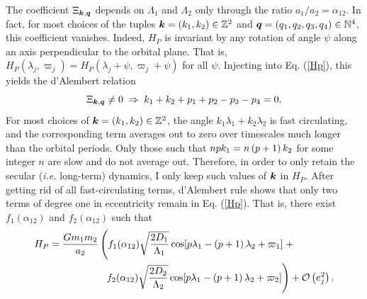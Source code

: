 \documentclass[12pt,a4paper,oneside]{article}
\begin{document}
The coefficient $\Xi_{\mathbf{\boldsymbol{k}},\mathbf{\boldsymbol{q}}}$ depends on $\Lambda_1$ and $\Lambda_2$ only through the ratio $a_1/a_2=\alpha_{12}$. In fact, for most choices of the tuples $\mathbf{\boldsymbol{k}}=\left(k_1,k_2\right)\in\mathbb{Z}^2$ and $\mathbf{\boldsymbol{q}}=\left(q_1,q_2,q_3,q_4\right)\in\mathbb{N}^4$, this coefficient vanishes. Indeed, $H_P$ is invariant by any rotation of angle $\psi$ along an axis perpendicular to the orbital plane. That is, $H_P(\lambda_j,\varpi_j)=H_P(\lambda_j+\psi,\varpi_j+\psi)$ for all $\psi$. Injecting into Eq. (\ref{Hp}), this yields the d'Alembert relation
\begin{equation}
	\Xi_{\mathbf{\boldsymbol{k}},\mathbf{\boldsymbol{q}}}\neq0\;\Rightarrow\;k_1+k_2+p_1+p_2-p_3-p_4=0.
\end{equation}
For most choices of $\mathbf{\boldsymbol{k}}=\left(k_1,k_2\right)\in\mathbb{Z}^2$, the angle $k_1\lambda_1+k_2\lambda_2$ is fast circulating, and the corresponding term averages out to zero over timescales much longer than the orbital periods. Only those such that $npk_1=n\left(p+1\right) k_2$ for some integer $n$ are slow and do not average out. Therefore, in order to only retain the secular (\textit{i.e.} long-term) dynamics, I only keep such values of $\mathbf{\boldsymbol{k}}$ in $H_P$. After getting rid of all fast-circulating terms, d'Alembert rule shows that only two terms of degree one in eccentricity remain in Eq. (\ref{Hp}). That is, there exist $f_1(\alpha_{12})$ and $f_2(\alpha_{12})$ such that
\begin{equation}\label{Pert_Poincare}
	\begin{split}
		H_P=\frac{Gm_1m_2}{a_2}&\left(f_1(\alpha_{12})\sqrt{\frac{2D_1}{\Lambda_1}}\cos[p\lambda_1-\left(p+1\right)\lambda_2+\varpi_1]\;+\right.\\
		&\left.\;\;f_2(\alpha_{12})\sqrt{\frac{2D_2}{\Lambda_2}}\cos[p\lambda_1-\left(p+1\right)\lambda_2+\varpi_2]\right)+\mathcal{O}\left(e_j^2\right).
	\end{split}
\end{equation}
\end{document}
